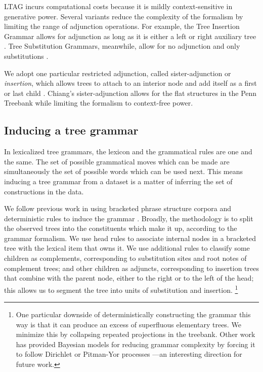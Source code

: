 \documentclass[11pt]{article}
\begin{document}
LTAG incurs computational costs because it is mildly context-sensitive
in generative power.
%
Several variants reduce the complexity of the formalism by limiting
the range of adjunction operations.
%
For example, the Tree Insertion Grammar allows for adjunction as long as it is either a left or right auxiliary tree \cite{Schabes1995}.
%
Tree Substitution Grammars, meanwhile, allow for no adjunction and
only substitutions \cite{cohn2009inducing}.

We adopt one particular restricted adjunction, called
sister-adjunction or \emph{insertion}, which allows trees to attach to
an interior node and add itself as a first or last child
\cite{chiang2000statistical}.
%
Chiang's sister-adjunction allows for the flat structures in
the Penn Treebank while limiting the formalism to context-free power.

\subsection{Inducing a tree grammar}

In lexicalized tree grammars, the lexicon and the grammatical rules
are one and the same.
%
The set of possible grammatical moves which can be made are simultaneously the set of possible words which can be used next.
%
This means inducing a tree grammar from a dataset is a matter of inferring the set of constructions in the data.


We follow previous work in using bracketed phrase structure corpora
and deterministic rules to induce the grammar
\cite{chiang2000statistical,bangalore2001impact}.
%
Broadly, the methodology is to split the observed trees into the
constituents which make it up, according to the grammar formalism.
%
We use head rules
\cite{chiang2000statistical,collins1997three,magerman1995statistical}
to associate internal nodes in a bracketed tree with the lexical item
that owns it.
%
We use additional rules to classify some children as complements,
corresponding to substitution sites and root notes of complement
trees; and other children as adjuncts, corresponding to insertion
trees that combine with the parent node, either to the right or to the
left of the head; this allows us to segment the tree into units of
substitution and insertion.%
\footnote{One particular downside of deterministically constructing
  the grammar this way is that it can produce an excess of superfluous
  elementary trees.
%
We minimize this by collapsing repeated projections in the treebank.
%
Other work has provided Bayesian models for reducing grammar
complexity by forcing it to follow Dirichlet or Pitman-Yor processes
\cite{Cohn2010}---an interesting direction for future work.}
\end{document}

